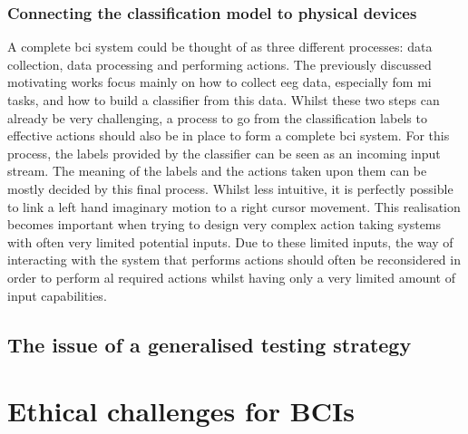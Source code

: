 
\subsubsection{Connecting the classification model to physical devices}
\label{subsubsec:bci_small_projects_motivating_examples_physical_devices}

A complete \gls{bci} system could be thought of as three different processes: data collection, data processing and performing actions.
The previously discussed motivating works focus mainly on how to collect \gls{eeg} data, especially fom \gls{mi} tasks, and how to build a classifier from this data.
Whilst these two steps can already be very challenging, a process to go from the classification labels to effective actions should also be in place to form a complete \gls{bci} system.
For this process, the labels provided by the classifier can be seen as an incoming input stream.
The meaning of the labels and the actions taken upon them can be mostly decided by this final process.
Whilst less intuitive, it is perfectly possible to link a left hand imaginary motion to a right cursor movement.
This realisation becomes important when trying to design very complex action taking systems with often very limited potential inputs.
Due to these limited inputs, the way of interacting with the system that performs actions should often be reconsidered in order to perform al required actions whilst having only a very limited amount of input capabilities.




\subsection{The issue of a generalised testing strategy}
\label{subsec:bci_small_projects_lack_of_testing}

\lipsum[1-2]


\section{Ethical challenges for BCIs}
\label{sec:bci_ethical}


